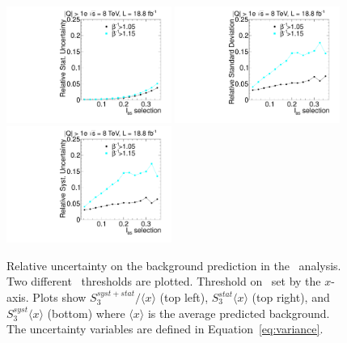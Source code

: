 \begin{figure}
 \begin{center}
 \includegraphics[clip=false, trim=0.0cm 0cm 0.0cm 0cm, width=0.48\textwidth]{figures/multi/Data8TeVCollisionStat}
 \includegraphics[clip=false, trim=0.0cm 0cm 0.0cm 0cm, width=0.48\textwidth]{figures/multi/Data8TeVCollisionStatSyst} \\
 \includegraphics[clip=false, trim=0.0cm 0cm 0.0cm 0cm, width=0.48\textwidth]{figures/multi/Data8TeVCollisionSyst}
\end{center}
\caption[Statistical and systematic uncertainty in the background prediction for different sets of thresholds in the \multi\ analysis]
{
Relative uncertainty on the background prediction in the \multi\ analysis.
Two different \invbeta\ thresholds are plotted. Threshold on \ias\ set by the $x$-axis.
Plots show $S^{syst+stat}_{3}/\langle x \rangle$ (top left), $S^{stat}_{3}\langle x \rangle$ (top right), and $S^{syst}_{3}\langle x \rangle$ (bottom)
where $\langle x \rangle$ is the average predicted background.
The uncertainty variables are defined in Equation~\ref{eq:variance}.
}
\label{fig:mCHAMPcorr2}
\end{figure}
